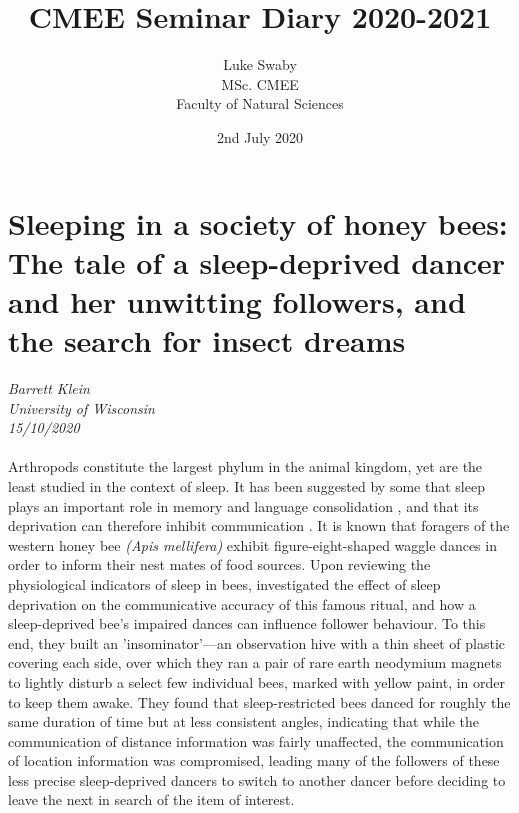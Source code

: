 \documentclass[11pt]{article}
\title{CMEE Seminar Diary 2020-2021}
\author{Luke Swaby\\MSc. CMEE\\Faculty of Natural Sciences}
\date{2nd July 2020}
\begin{document}
    \maketitle

\newpage

\section{Sleeping in a society of honey bees: The tale of a sleep-deprived dancer and her unwitting followers, and the search for insect dreams}
\textit{Barrett Klein\\University of Wisconsin\\15/10/2020}
\\
\\
Arthropods constitute the largest phylum in the animal kingdom, yet are the least studied in the context of sleep. It has been suggested by some that sleep plays an important role in memory and language consolidation \citep{fenn2003consolidation}, and that its deprivation can therefore inhibit communication \citep{morris1960misperception, Boyce}. It is known that foragers of the western honey bee \emph{(Apis mellifera)} exhibit figure-eight-shaped waggle dances in order to inform their nest mates of food sources.  Upon reviewing the physiological indicators of sleep in bees, \cite{klein2010sleep} investigated the effect of sleep deprivation on the communicative accuracy of this famous ritual, and how a sleep-deprived bee’s impaired dances can influence follower behaviour. To this end, they built an 'insominator'—an observation hive with a thin sheet of plastic covering each side, over which they ran a pair of rare earth neodymium magnets to lightly disturb a select few individual bees, marked with yellow paint, in order to keep them awake. They found that sleep-restricted bees danced for roughly the same duration of time but at less consistent angles, indicating that while the communication of distance information was fairly unaffected, the communication of location information was compromised, leading many of the followers of these less precise sleep-deprived dancers to switch to another dancer before deciding to leave the next in search of the item of interest.
\end{document}
